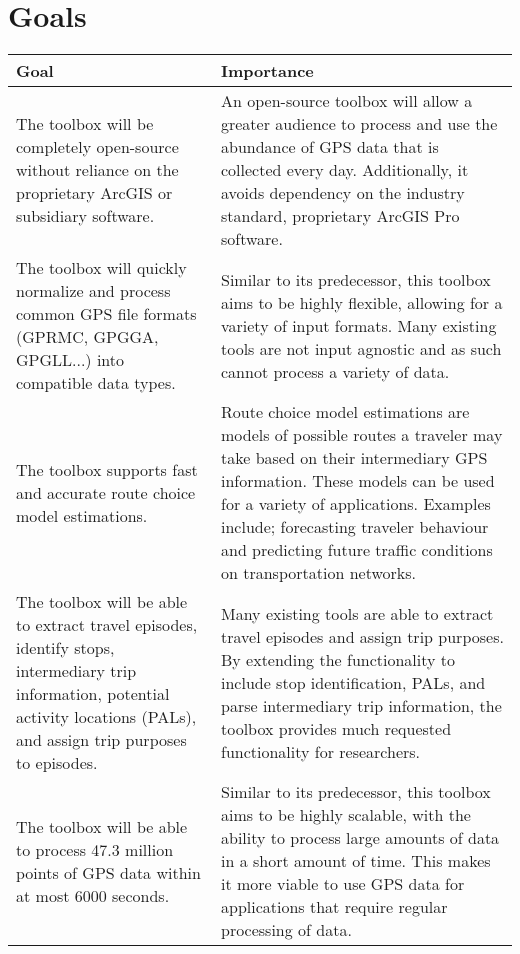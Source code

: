 \documentclass{article}
\begin{document}
\section{Goals}
\begin{table}[h!]
    \centering
        \begin{tabular}{|p{6cm}|p{6cm}|}
    		\hline
    		\textbf{Goal} & \textbf{Importance} \\
    		\hline
    		The toolbox will be completely open-source without reliance on the proprietary ArcGIS or subsidiary software. & An open-source toolbox will allow a greater audience to process and use the abundance of GPS data that is collected every day. Additionally, it avoids dependency on the industry standard, proprietary ArcGIS Pro software. \\
    		\hline
    		The toolbox will quickly normalize and process common GPS file formats (GPRMC, GPGGA, GPGLL...) into compatible data types. & Similar to its predecessor, this toolbox aims to be highly flexible, allowing for a variety of input formats. Many existing tools are not input agnostic and as such cannot process a variety of data.  \\
    		\hline
    		The toolbox supports fast and accurate route choice model estimations. & Route choice model estimations are models of possible routes a traveler may take based on their intermediary GPS information. These models can be used for a variety of applications. Examples include; forecasting traveler behaviour and predicting future traffic conditions on transportation networks. \\
    		\hline
    		The toolbox will be able to extract travel episodes, identify stops, intermediary trip information, potential activity locations (PALs), and assign trip purposes to episodes. & Many existing tools are able to extract travel episodes and assign trip purposes. By extending the functionality to include stop identification, PALs, and parse intermediary trip information, the toolbox provides much requested functionality for researchers. \\
    		\hline
    		The toolbox will be able to process 47.3 million points of GPS data within at most 6000 seconds. & Similar to its predecessor, this toolbox aims to be highly scalable, with the ability to process large amounts of data in a short amount of time. This makes it more viable to use GPS data for applications that require regular processing of data.\\
    		\hline
    	\end{tabular}
		
\end{table}
\end{document}
